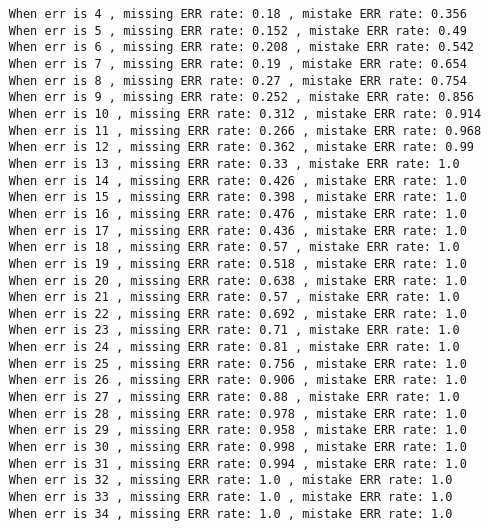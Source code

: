 \documentclass{article}
\begin{document}
\begin{verbatim}
    When err is 4 , missing ERR rate: 0.18 , mistake ERR rate: 0.356
    When err is 5 , missing ERR rate: 0.152 , mistake ERR rate: 0.49
    When err is 6 , missing ERR rate: 0.208 , mistake ERR rate: 0.542
    When err is 7 , missing ERR rate: 0.19 , mistake ERR rate: 0.654
    When err is 8 , missing ERR rate: 0.27 , mistake ERR rate: 0.754
    When err is 9 , missing ERR rate: 0.252 , mistake ERR rate: 0.856
    When err is 10 , missing ERR rate: 0.312 , mistake ERR rate: 0.914
    When err is 11 , missing ERR rate: 0.266 , mistake ERR rate: 0.968
    When err is 12 , missing ERR rate: 0.362 , mistake ERR rate: 0.99
    When err is 13 , missing ERR rate: 0.33 , mistake ERR rate: 1.0
    When err is 14 , missing ERR rate: 0.426 , mistake ERR rate: 1.0
    When err is 15 , missing ERR rate: 0.398 , mistake ERR rate: 1.0
    When err is 16 , missing ERR rate: 0.476 , mistake ERR rate: 1.0
    When err is 17 , missing ERR rate: 0.436 , mistake ERR rate: 1.0
    When err is 18 , missing ERR rate: 0.57 , mistake ERR rate: 1.0
    When err is 19 , missing ERR rate: 0.518 , mistake ERR rate: 1.0
    When err is 20 , missing ERR rate: 0.638 , mistake ERR rate: 1.0
    When err is 21 , missing ERR rate: 0.57 , mistake ERR rate: 1.0
    When err is 22 , missing ERR rate: 0.692 , mistake ERR rate: 1.0
    When err is 23 , missing ERR rate: 0.71 , mistake ERR rate: 1.0
    When err is 24 , missing ERR rate: 0.81 , mistake ERR rate: 1.0
    When err is 25 , missing ERR rate: 0.756 , mistake ERR rate: 1.0
    When err is 26 , missing ERR rate: 0.906 , mistake ERR rate: 1.0
    When err is 27 , missing ERR rate: 0.88 , mistake ERR rate: 1.0
    When err is 28 , missing ERR rate: 0.978 , mistake ERR rate: 1.0
    When err is 29 , missing ERR rate: 0.958 , mistake ERR rate: 1.0
    When err is 30 , missing ERR rate: 0.998 , mistake ERR rate: 1.0
    When err is 31 , missing ERR rate: 0.994 , mistake ERR rate: 1.0
    When err is 32 , missing ERR rate: 1.0 , mistake ERR rate: 1.0
    When err is 33 , missing ERR rate: 1.0 , mistake ERR rate: 1.0
    When err is 34 , missing ERR rate: 1.0 , mistake ERR rate: 1.0
  \end{verbatim}
  
\end{document}
